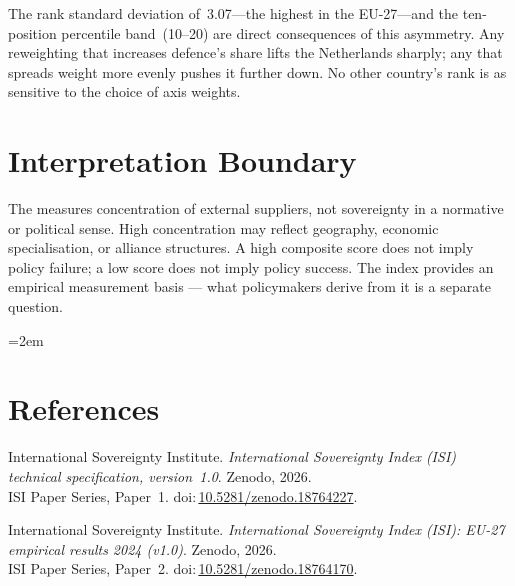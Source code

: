 \documentclass[12pt,a4paper]{article}
\begin{document}
The rank standard deviation of~3.07---the highest in the EU-27---and the ten-position percentile band~(10--20) are direct consequences of this asymmetry.  Any reweighting that increases defence's share lifts the Netherlands sharply; any that spreads weight more evenly pushes it further down.  No other country's rank is as sensitive to the choice of axis weights.


\section{Interpretation Boundary}
\label{sec:interpretation}

The \ISI measures concentration of external suppliers, not sovereignty in a normative or political sense.  High concentration may reflect geography, economic specialisation, or alliance structures.  A high composite score does not imply policy failure; a low score does not imply policy success.  The index provides an empirical measurement basis --- what policymakers derive from it is a separate question.


\clearpage
\vspace*{1.5cm}

\begingroup\emergencystretch=2em
\section*{References}

\begin{enumerate}[label={[\arabic*]},leftmargin=2em,itemsep=6pt]
\item International Sovereignty Institute.
  \textit{International Sovereignty Index (ISI) technical specification, version~1.0}.
  Zenodo, 2026.\\ISI Paper Series, Paper~1.
  doi:\,\href{https://doi.org/10.5281/zenodo.18764227}{10.5281/zenodo.18764227}.

\item International Sovereignty Institute.
  \textit{International Sovereignty Index (ISI): EU-27 empirical results 2024 (v1.0)}.
  Zenodo, 2026.\\ISI Paper Series, Paper~2.
  doi:\,\href{https://doi.org/10.5281/zenodo.18764170}{10.5281/zenodo.18764170}.
\end{enumerate}
\endgroup
\end{document}
